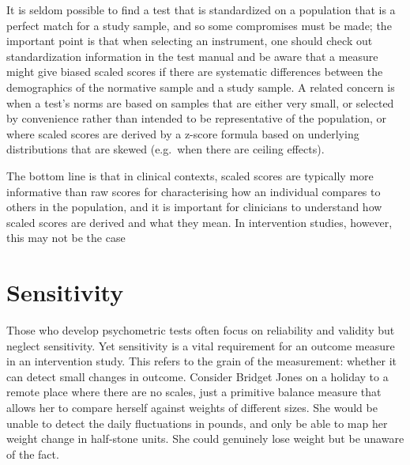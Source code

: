 \documentclass{krantz}
\begin{document}
It is seldom possible to find a test that is standardized on a population that is a perfect match for a study sample, and so some compromises must be made; the important point is that when selecting an instrument, one should check out standardization information in the test manual and be aware that a measure might give biased scaled scores if there are systematic differences between the demographics of the normative sample and a study sample. A related concern is when a test's norms are based on samples that are either very small, or selected by convenience rather than intended to be representative of the population, or where scaled scores are derived by a z-score formula based on underlying distributions that are skewed (e.g.~when there are ceiling effects).

The bottom line is that in clinical contexts, scaled scores are typically more informative than raw scores for characterising how an individual compares to others in the population, and it is important for clinicians to understand how scaled scores are derived and what they mean. In intervention studies, however, this may not be the case

\hypertarget{sensitivity}{%
\section{Sensitivity}\label{sensitivity}}

Those who develop psychometric tests often focus on reliability and validity but neglect sensitivity. Yet sensitivity is a vital requirement for an outcome measure in an intervention study. This refers to the grain of the measurement: whether it can detect small changes in outcome. Consider Bridget Jones on a holiday to a remote place where there are no scales, just a primitive balance measure that allows her to compare herself against weights of different sizes. She would be unable to detect the daily fluctuations in pounds, and only be able to map her weight change in half-stone units. She could genuinely lose weight but be unaware of the fact.
\end{document}
